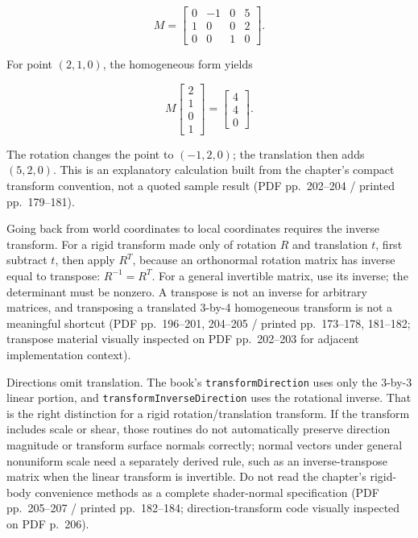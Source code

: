\[
M = \begin{bmatrix}0&-1&0&5\\1&0&0&2\\0&0&1&0\end{bmatrix}.
\]

For point \((2,1,0)\), the homogeneous form yields

\[
M\begin{bmatrix}2\\1\\0\\1\end{bmatrix}=\begin{bmatrix}4\\4\\0\end{bmatrix}.
\]

The rotation changes the point to \((-1,2,0)\); the translation then adds \((5,2,0)\). This is an explanatory calculation built from the chapter's compact transform convention, not a quoted sample result (PDF pp.~202--204 / printed pp.~179--181).

Going back from world coordinates to local coordinates requires the inverse transform. For a rigid transform made only of rotation \(R\) and translation \(t\), first subtract \(t\), then apply \(R^T\), because an orthonormal rotation matrix has inverse equal to transpose: \(R^{-1}=R^T\). For a general invertible matrix, use its inverse; the determinant must be nonzero. A transpose is not an inverse for arbitrary matrices, and transposing a translated 3-by-4 homogeneous transform is not a meaningful shortcut (PDF pp.~196--201, 204--205 / printed pp.~173--178, 181--182; transpose material visually inspected on PDF pp.~202--203 for adjacent implementation context).

Directions omit translation. The book's \texttt{transformDirection} uses only the 3-by-3 linear portion, and \texttt{transformInverseDirection} uses the rotational inverse. That is the right distinction for a rigid rotation/translation transform. If the transform includes scale or shear, those routines do not automatically preserve direction magnitude or transform surface normals correctly; normal vectors under general nonuniform scale need a separately derived rule, such as an inverse-transpose matrix when the linear transform is invertible. Do not read the chapter's rigid-body convenience methods as a complete shader-normal specification (PDF pp.~205--207 / printed pp.~182--184; direction-transform code visually inspected on PDF p.~206).

